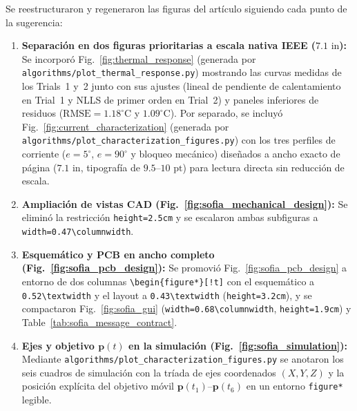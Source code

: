 \documentclass{LabDSTresponse}
\begin{document}
{Se reestructuraron y regeneraron las figuras del artículo siguiendo cada punto de la sugerencia:
\begin{enumerate}
    \item \textbf{Separación en dos figuras prioritarias a escala nativa IEEE ($7.1\text{ in}$):} Se incorporó Fig.~\ref{fig:thermal_response} (generada por \texttt{algorithms/plot\_thermal\_response.py}) mostrando las curvas medidas de los Trials~1 y~2 junto con sus ajustes (lineal de pendiente de calentamiento en Trial~1 y NLLS de primer orden en Trial~2) y paneles inferiores de residuos ($\text{RMSE} = 1.18^\circ\text{C}$ y $1.09^\circ\text{C}$). Por separado, se incluyó Fig.~\ref{fig:current_characterization} (generada por \texttt{algorithms/plot\_characterization\_figures.py}) con los tres perfiles de corriente ($e = 5^\circ$, $e = 90^\circ$ y bloqueo mecánico) diseñados a ancho exacto de página ($7.1\text{ in}$, tipografía de $9.5\text{--}10\text{ pt}$) para lectura directa sin reducción de escala.
    \item \textbf{Ampliación de vistas CAD (Fig.~\ref{fig:sofia_mechanical_design}):} Se eliminó la restricción \texttt{height=2.5cm} y se escalaron ambas subfiguras a \texttt{width=0.47\textbackslash columnwidth}.
    \item \textbf{Esquemático y PCB en ancho completo (Fig.~\ref{fig:sofia_pcb_design}):} Se promovió Fig.~\ref{fig:sofia_pcb_design} a entorno de dos columnas \texttt{\textbackslash begin\{figure*\}[!t]} con el esquemático a \texttt{0.52\textbackslash textwidth} y el layout a \texttt{0.43\textbackslash textwidth} (\texttt{height=3.2cm}), y se compactaron Fig.~\ref{fig:sofia_gui} (\texttt{width=0.68\textbackslash columnwidth}, \texttt{height=1.9cm}) y Table~\ref{tab:sofia_message_contract}.
    \item \textbf{Ejes y objetivo $\mathbf{p}(t)$ en la simulación (Fig.~\ref{fig:sofia_simulation}):} Mediante \texttt{algorithms/plot\_characterization\_figures.py} se anotaron los seis cuadros de simulación con la tríada de ejes coordenados $(X,Y,Z)$ y la posición explícita del objetivo móvil $\mathbf{p}(t_1)\text{--}\mathbf{p}(t_6)$ en un entorno \texttt{figure*} legible.
\end{enumerate}}
\end{document}
